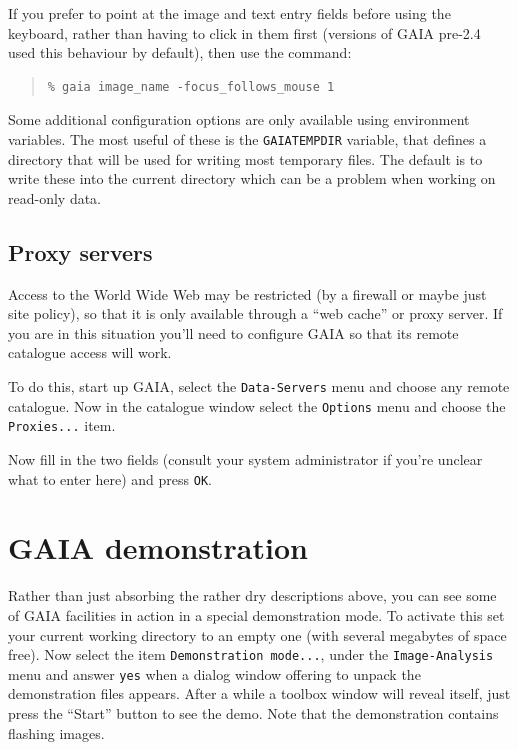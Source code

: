 \documentclass[twoside,11pt]{article}
\newcommand{\xlabel}[1]{}
\renewcommand{\_}{\texttt{\symbol{95}}}
\newcommand{\mytt}[1]{{\texttt{#1}}}
\begin{document}
If you prefer to point at the image and text entry fields before using
the keyboard, rather than having to click in them first (versions of
GAIA pre-2.4 used this behaviour by default), then use the command:
\begin{quote}
\begin{verbatim}
% gaia image_name -focus_follows_mouse 1
\end{verbatim}
\end{quote}

Some additional configuration options are only available using environment
variables. The most useful of these is the \mytt{GAIA\_TEMP\_DIR} variable,
that defines a directory that will be used for writing most temporary files.
The default is to write these into the current directory which can be a
problem when working on read-only data.

\subsection{\xlabel{proxy_servers}Proxy servers}
Access to the World Wide Web may be restricted (by a firewall or maybe
just site policy), so that it is only available through a ``web
cache'' or proxy server. If you are in this situation you'll need to
configure GAIA so that its remote catalogue access will work.

To do this, start up GAIA, select the \mytt{Data-Servers} menu and
choose any remote catalogue. Now in the catalogue window select the
\mytt{Options} menu and choose the \mytt{Proxies...} item.

Now fill in the two fields (consult your system administrator if you're
unclear what to enter here) and press \mytt{OK}.

\section{\xlabel{gaia_demonstration}GAIA demonstration}
Rather than just absorbing the rather dry descriptions above, you can
see some of GAIA facilities in action in a special demonstration
mode. To activate this set your current working directory to an empty
one (with several megabytes of space free). Now select the item
\mytt{Demonstration mode...}, under the \mytt{Image-Analysis} menu and
answer \mytt{yes} when a dialog window offering to unpack the
demonstration files appears. After a while a toolbox window will
reveal itself, just press the ``Start'' button to see the demo. Note
that the demonstration contains flashing images.
\end{document}
